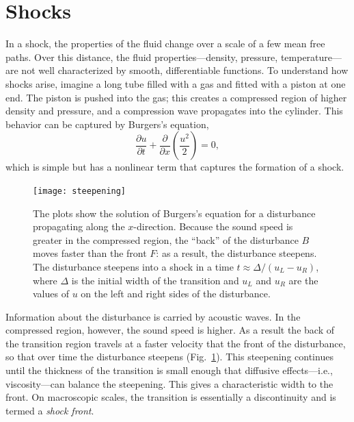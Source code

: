 \section{Shocks}
\newcommand{\gpo}{\ensuremath{(\gamma+1)}}
\newcommand{\gmo}{\ensuremath{(\gamma-1)}}

In a shock, the properties of the fluid change over a scale of a few mean free paths.  Over this distance, the fluid properties---density, pressure, temperature---are not well characterized by smooth, differentiable functions. To understand how shocks arise, imagine a long tube filled with a gas and fitted with a piston at one end. The piston is pushed into the gas; this creates a compressed region of higher density and pressure, and a compression wave propagates into the cylinder.  This behavior can be captured by Burgers's equation,
\[ \frac{\partial u}{\partial t} + \frac{\partial}{\partial x}\left(\frac{u^{2}}{2}\right) = 0, \]
which is simple but has a nonlinear term that captures the formation of a shock.

\begin{figure}
\texttt{[image: steepening]}
\caption[A disturbance steepening as it propagates.]{The plots show the solution of Burgers's equation for a disturbance propagating along the $x$-direction.  Because the sound speed is greater in the compressed region, the ``back'' of the disturbance $B$ moves faster than the front $F$: as a result, the disturbance steepens.  The disturbance steepens into a shock in a time $t\approx \Delta/(u_{L}-u_{R})$, where $\Delta$ is the initial width of the transition and $u_{L}$ and $u_{R}$ are the values of $u$ on the left and right sides of the disturbance.  }
\label{f.steepening}
\end{figure}

Information about the disturbance is carried by acoustic waves.  In the compressed region, however, the sound speed is higher.  As a result the back of the transition region travels at a faster velocity that the front of the disturbance, so that over time the disturbance steepens (Fig.~\ref{f.steepening}). This steepening continues until the thickness of the transition is small enough that diffusive effects---i.e., viscosity---can balance the steepening.  This gives a characteristic width to the front.  On macroscopic scales, the transition is essentially a discontinuity and is termed a \emph{shock front}.

